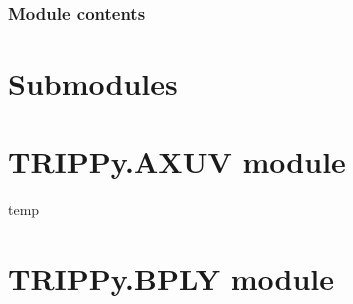 \documentclass[letterpaper,10pt,english]{sphinxmanual}
\begin{document}
\begin{fulllineitems}
\label{TRIPPy.plot:TRIPPy.plot.plot.plotVol}
\end{fulllineitems}


\begin{fulllineitems}
\label{TRIPPy.plot:TRIPPy.plot.plot.plotVol2}
\end{fulllineitems}



\subsection{Module contents}
\label{TRIPPy.plot:module-TRIPPy.plot}\label{TRIPPy.plot:module-contents}

\chapter{Submodules}
\label{TRIPPy:submodules}

\chapter{TRIPPy.AXUV module}
\label{TRIPPy:trippy-axuv-module}\label{TRIPPy:module-TRIPPy.AXUV}

\begin{fulllineitems}
\label{TRIPPy:TRIPPy.AXUV.AXUV20}
\end{fulllineitems}


\begin{fulllineitems}
\label{TRIPPy:TRIPPy.AXUV.AXUV22}
temp

\end{fulllineitems}



\chapter{TRIPPy.BPLY module}
\label{TRIPPy:module-TRIPPy.BPLY}\label{TRIPPy:trippy-bply-module}
\end{document}
